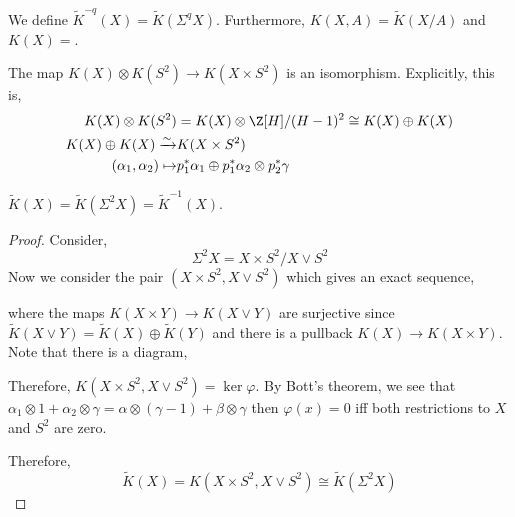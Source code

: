 \documentclass[12pt]{extarticle}
\begin{document}
\begin{defn}
We define $\tilde{K}^{-q}(X) = \tilde{K}(\Sigma^q X)$. Furthermore, $K(X, A) = \tilde{K}(X/A)$ and $K(X) = $.
\end{defn}

\begin{thm}[Bott]
The map $K(X) \otimes K(S^2) \to K(X \times S^2)$ is an isomorphism. Explicitly, this is,
\begin{align*}
K(X) \otimes K(S^2) & = K(X) \otimes \Z[H]/(H-1)^2 \cong K(X) \oplus K(X)
\\
K(X) \oplus K(X) \xrightarrow{\sim} & K(X \times S^2)
\\
(\alpha_1, \alpha_2) \mapsto & p_1^* \alpha_1 \oplus p_1^* \alpha_2 \otimes p_2^* \gamma  
\end{align*}
\end{thm}

\begin{cor}
$\tilde{K}(X) = \tilde{K}(\Sigma^2 X) = \tilde{K}^{-1}(X)$. 
\end{cor}

\begin{proof}
Consider,
\[ \Sigma^2 X = X \times S^2 / X \vee S^2 \]
Now we consider the pair $(X \times S^2, X \vee S^2)$ which gives an exact sequence,
\begin{center}
\end{center}
where the maps $K(X \times Y) \to K(X \vee Y)$ are surjective since $\tilde{K}(X \vee Y) = \tilde{K}(X) \oplus \tilde{K}(Y)$ and there is a pullback $K(X) \to K(X \times Y)$.
Note that there is a diagram,
\begin{center}
\end{center}
Therefore,  $K(X \times S^2, X \vee S^2) = \ker{\varphi}$. By Bott's theorem, we see that $\alpha_1 \otimes 1 + \alpha_2 \otimes \gamma = \alpha \otimes (\gamma - 1) + \beta \otimes \gamma$ then $\varphi(x) = 0$ iff both restrictions to $X$ and $S^2$ are zero. 

Therefore, 
\[ \tilde{K}(X) = K(X \times S^2, X \vee S^2) \cong \tilde{K}(\Sigma^2 X) \]
\end{proof}
\end{document}

